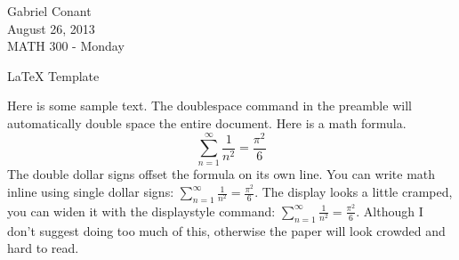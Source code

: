 \documentclass[12pt]{article}
\begin{document}
 

Gabriel Conant\\
August 26, 2013\\
MATH 300 - Monday

\begin{center}
LaTeX Template
\end{center}

Here is some sample text. The doublespace command in the preamble will automatically double space the entire document. Here is a math formula.
$$
\sum_{n=1}^\infty\frac{1}{n^2}=\frac{\pi^2}{6}
$$
The double dollar signs offset the formula on its own line. You can write math inline using single dollar signs: $\sum_{n=1}^\infty\frac{1}{n^2}=\frac{\pi^2}{6}$. The display looks a little cramped, you can widen it with the displaystyle command: $\displaystyle\sum_{n=1}^\infty\frac{1}{n^2}=\frac{\pi^2}{6}$. Although I don't suggest doing too much of this, otherwise the paper will look crowded and hard to read.
\end{document}
